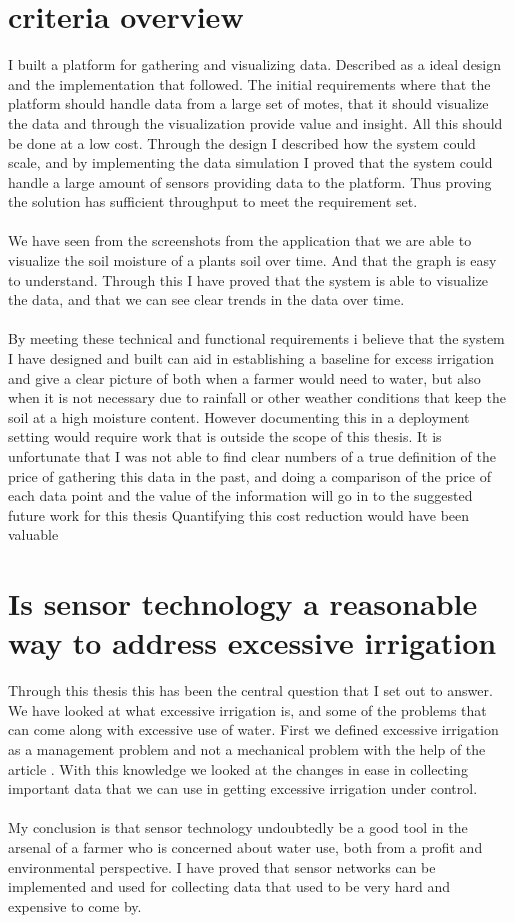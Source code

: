 \documentclass[]{uiophd}
\begin{document}
\section{criteria overview}
I built a platform for gathering and visualizing data. Described as a ideal design and the implementation that followed. The initial requirements where that the platform should handle data from a large set of motes, that it should visualize the data and through the visualization provide value and insight. All this should be done at a low cost. Through the design I described how the system could scale, and by implementing the data simulation I proved that the system could handle a large amount of sensors providing data to the platform. Thus proving the solution has sufficient throughput to meet the requirement set.
\\\\
We have seen from the screenshots from the application that we are able to visualize the soil moisture of a plants soil over time. And that the graph is easy to understand. Through this I have proved that the system is able to visualize the data, and that we can see clear trends in the data over time.
\\\\
By meeting these technical and functional requirements i believe that the system I have designed and built can aid in establishing a baseline for excess irrigation and give a clear picture of both when a farmer would need to water, but also when it is not necessary due to rainfall or other weather conditions that keep the soil at a high moisture content. However documenting this in a deployment setting would require work that is outside the scope of this thesis. It is unfortunate that I was not able to find clear numbers of a true definition of the price of gathering this data in the past, and doing a comparison of the price of each data point and the value of the information will go in to the suggested future work for this thesis Quantifying this cost reduction would have been valuable


\section{ Is sensor technology a reasonable way to address excessive irrigation}

Through this thesis this has been the central question that I set out to answer. We have looked at what excessive irrigation is, and some of the problems that can come along with excessive use of water. First we defined excessive irrigation as a management problem and not a mechanical problem with the help of the article \parencite{LILIENFELD200773}. With this knowledge we looked at the changes in ease in collecting important data that we can use in getting excessive irrigation under control. 
\\\\
My conclusion is that sensor technology undoubtedly be a good tool in the arsenal of a farmer who is concerned about water use, both from a profit and environmental perspective. I have proved that sensor networks can be implemented and used for collecting data that used to be very hard and expensive to come by.
\end{document}
